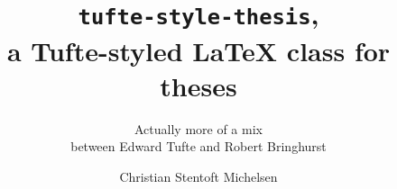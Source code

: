 \documentclass[
    11pt,
	colorful,
	boxey,
]{tufte-style-thesis}
\author{Christian Stentoft Michelsen}
\title{\texttt{tufte-style-thesis},\\a Tufte-styled \LaTeX{} class for theses}
\subtitle{Actually more of a mix\\between Edward Tufte and Robert Bringhurst}
\begin{document}
\maketitle

\frontmatter



\tableofcontents
\listoffigures
\listoftables
\listoflistings


\mainmatter






\backmatter


\end{document}
